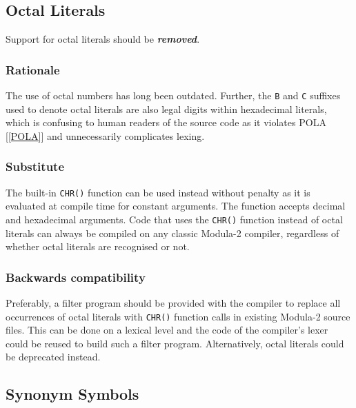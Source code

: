 \documentclass[10pt,a4paper]{article}
\renewcommand{\emph}[1]{\textbf{\textit{#1}}}
\begin{document}
\subsection{Octal Literals}

Support for octal literals should be \emph{removed}.

\subsubsection{Rationale}

The use of octal numbers has long been outdated. Further, the \verb|B| and
\verb|C| suffixes used to denote octal literals are also legal digits within
hexadecimal literals, which is confusing to human readers of the source code as
it violates POLA [\ref{POLA}] and unnecessarily complicates lexing.

\subsubsection{Substitute}

The built-in \verb|CHR()| function can be used instead without penalty as it is
evaluated at compile time for constant arguments. The function accepts decimal
and hexadecimal arguments. Code that uses the \verb|CHR()| function instead of
octal literals can always be compiled on any classic Modula-2 compiler,
regardless of whether octal literals are recognised or not.

\subsubsection{Backwards compatibility}

Preferably, a filter program should be provided with the compiler to replace
all occurrences of octal literals with \verb|CHR()| function calls in existing
Modula-2 source files. This can be done on a lexical level and the code of the
compiler's lexer could be reused to build such a filter program. Alternatively,
octal literals could be deprecated instead.


\subsection{Synonym Symbols}
\end{document}

